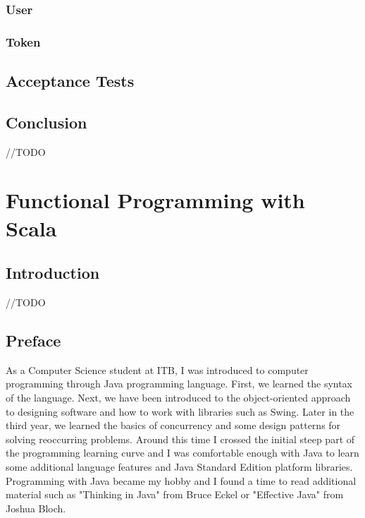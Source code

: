 \documentclass[12pt,twoside,a4paper]{report}
\begin{document}
\subsection{User}\label{5.2.2}

\subsection{Token}\label{5.2.3}

\section{Acceptance Tests}\label{5.3}

\section{Conclusion}\label{5.4}
//TODO










\chapter{Functional Programming with Scala}\label{6}

\section{Introduction}\label{6.1}
//TODO

\section{Preface}\label{6.2}
As a Computer Science student at ITB, I was introduced to computer programming through Java programming language. First, we learned the syntax of the language. Next, we have been introduced to the object-oriented approach to designing software and how to work with libraries such as Swing. Later in the third year, we learned the basics of concurrency and some design patterns for solving reoccurring problems. Around this time I crossed the initial steep part of the programming learning curve and I was comfortable enough with Java to learn some additional language features and Java Standard Edition platform libraries. Programming with Java became my hobby and I found a time to read additional material such as "Thinking in Java" from Bruce Eckel or "Effective Java" from Joshua Bloch.
\end{document}
